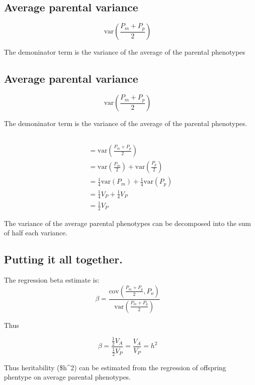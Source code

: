 \documentclass[
  letterpaper,
  DIV=11,
  numbers=noendperiod]{scrartcl}
\begin{document}
\subsection{Average parental variance}\label{average-parental-variance}

\[
\mathrm{var}(\frac{P_m + P_p}{2})
\]

The demoninator term is the variance of the average of the parental
phenotypes

\subsection{Average parental
variance}\label{average-parental-variance-1}

\[
\mathrm{var}(\frac{P_m + P_p}{2})
\]

The demoninator term is the variance of the average of the parental
phenotypes.

\subsection{}\label{section-2}

\[
\begin{eqnarray}
& = \mathrm{var}(\frac{P_m + P_p}{2}) \\
& = \mathrm{var}(\frac{P_m}{2}) + \mathrm{var}(\frac{P_p}{2}) \\
& = \frac{1}{4}\mathrm{var}(P_m) + \frac{1}{4} \mathrm{var}(P_p) \\
& = \frac{1}{4} V_P  + \frac{1}{4} V_P \\
& = \frac{1}{2} V_P
\end{eqnarray}
\]

The variance of the average parental phenotypes can be decomposed into
the sum of half each variance.

\subsection{Putting it all together.}\label{putting-it-all-together.}

The regression beta estimate is: \[
\beta = \frac{\mathrm{cov}(\frac{P_m + P_p}{2}, P_o)}{\mathrm{var}(\frac{P_m + P_p}{2})}
\]

Thus

\[
\beta = \frac{\frac{1}{2} V_A} {\frac{1}{2} V_P} = \frac{V_A}{V_P}  = h^2
\]

Thus heritability (\$h\^{}2) can be estimated from the regression of
offspring phentype on average parental phenotypes.
\end{document}
